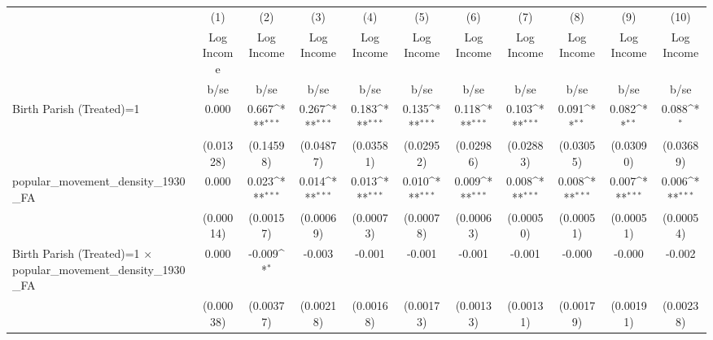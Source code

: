 {
\def\sym#1{\ifmmode^{#1}\else\(^{#1}\)\fi}
\begin{tabular}{l*{10}{c}}
\hline\hline
                    &\multicolumn{1}{c}{(1)}&\multicolumn{1}{c}{(2)}&\multicolumn{1}{c}{(3)}&\multicolumn{1}{c}{(4)}&\multicolumn{1}{c}{(5)}&\multicolumn{1}{c}{(6)}&\multicolumn{1}{c}{(7)}&\multicolumn{1}{c}{(8)}&\multicolumn{1}{c}{(9)}&\multicolumn{1}{c}{(10)}\\
                    &\multicolumn{1}{c}{Log Income}&\multicolumn{1}{c}{Log Income}&\multicolumn{1}{c}{Log Income}&\multicolumn{1}{c}{Log Income}&\multicolumn{1}{c}{Log Income}&\multicolumn{1}{c}{Log Income}&\multicolumn{1}{c}{Log Income}&\multicolumn{1}{c}{Log Income}&\multicolumn{1}{c}{Log Income}&\multicolumn{1}{c}{Log Income}\\
                    &        b/se         &        b/se         &        b/se         &        b/se         &        b/se         &        b/se         &        b/se         &        b/se         &        b/se         &        b/se         \\
\hline
Birth Parish (Treated)=1&       0.000         &       0.667\sym{***}&       0.267\sym{***}&       0.183\sym{***}&       0.135\sym{***}&       0.118\sym{***}&       0.103\sym{***}&       0.091\sym{**} &       0.082\sym{**} &       0.088\sym{*}  \\
                    &   (0.01328)         &   (0.14598)         &   (0.04877)         &   (0.03581)         &   (0.02952)         &   (0.02986)         &   (0.02883)         &   (0.03055)         &   (0.03090)         &   (0.03689)         \\
popular\_movement\_density\_1930\_FA&       0.000         &       0.023\sym{***}&       0.014\sym{***}&       0.013\sym{***}&       0.010\sym{***}&       0.009\sym{***}&       0.008\sym{***}&       0.008\sym{***}&       0.007\sym{***}&       0.006\sym{***}\\
                    &   (0.00014)         &   (0.00157)         &   (0.00069)         &   (0.00073)         &   (0.00078)         &   (0.00063)         &   (0.00050)         &   (0.00051)         &   (0.00051)         &   (0.00054)         \\
Birth Parish (Treated)=1 $\times$ popular\_movement\_density\_1930\_FA&       0.000         &      -0.009\sym{*}  &      -0.003         &      -0.001         &      -0.001         &      -0.001         &      -0.001         &      -0.000         &      -0.000         &      -0.002         \\
                    &   (0.00038)         &   (0.00377)         &   (0.00218)         &   (0.00168)         &   (0.00173)         &   (0.00133)         &   (0.00131)         &   (0.00179)         &   (0.00191)         &   (0.00238)         \\

\end{tabular}}
